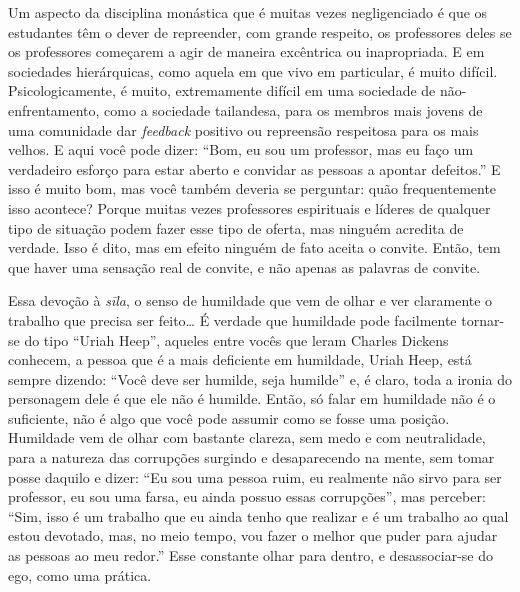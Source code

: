Um aspecto da disciplina monástica que é muitas vezes negligenciado
é que os estudantes têm o dever de repreender, com grande respeito, os
professores deles se os professores começarem a agir de maneira
excêntrica ou inapropriada. E em sociedades hierárquicas, como aquela
em que vivo em particular, é muito difícil. Psicologicamente, é muito,
extremamente difícil em uma sociedade de não-enfrentamento, como a
sociedade tailandesa, para os membros mais jovens de uma comunidade dar
\textit{feedback} positivo ou repreensão respeitosa para os mais
velhos. E aqui você pode dizer: “Bom, eu sou um professor, mas eu faço
um verdadeiro esforço para estar aberto e convidar as pessoas a apontar
defeitos.” E isso é muito bom, mas você também deveria se perguntar:
quão frequentemente isso acontece? Porque muitas vezes professores
espirituais e líderes de qualquer tipo de situação podem fazer esse
tipo de oferta, mas ninguém acredita de verdade. Isso é dito, mas em
efeito ninguém de fato aceita o convite. Então, tem que haver uma
sensação real de convite, e não apenas as palavras de convite. 

Essa devoção à \textit{sīla}, o senso de humildade que vem de
olhar e ver claramente o trabalho que precisa ser feito… É verdade que
humildade pode facilmente tornar-se do tipo “Uriah Heep”, aqueles entre
vocês que leram Charles Dickens conhecem, a pessoa que é a mais
deficiente em humildade, Uriah Heep, está sempre dizendo: “Você deve
ser humilde, seja humilde” e, é claro, toda a ironia do personagem dele
é que ele não é humilde. Então, só falar em humildade não é o
suficiente, não é algo que você pode assumir como se fosse uma posição.
Humildade vem de olhar com bastante clareza, sem medo e com
neutralidade, para a natureza das corrupções surgindo e desaparecendo
na mente, sem tomar posse daquilo e dizer: “Eu sou uma pessoa ruim, eu
realmente não sirvo para ser professor, eu sou uma farsa, eu ainda
possuo essas corrupções”, mas perceber: “Sim, isso é um trabalho que eu
ainda tenho que realizar e é um trabalho ao qual estou devotado, mas,
no meio tempo, vou fazer o melhor que puder para ajudar as pessoas ao
meu redor.” Esse constante olhar para dentro, e desassociar-se do ego,
como uma prática. 

